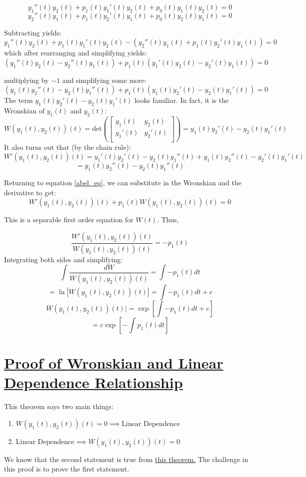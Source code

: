 \documentclass{report}
\begin{document}
{$$y_1''(t)y_2(t) + p_1(t)y_1'(t)y_2(t) + p_0(t)y_1(t)y_2(t) = 0$$
$$y_2''(t)y_1(t) + p_1(t)y_2'(t)y_1(t) + p_0(t)y_2(t)y_1(t) = 0$$

Subtracting yields:
$$y_1''(t)y_2(t) + p_1(t)y_1'(t)y_2(t) - (y_2''(t)y_1(t) + p_1(t)y_2'(t)y_1(t)) = 0$$
which after rearranging and simplifying yields:
\begin{equation}
\label{abel_eq}
(y_1''(t)y_2(t)-y_2''(t)y_1(t))+p_1(t)(y_1'(t)y_2(t)-y_2'(t)y_1(t)) = 0
\end{equation}

multiplying by $-1$ and simplifying some more:
$$(y_1(t)y_2''(t)-y_2(t)y_1''(t))+p_1(t)(y_1(t)y_2'(t)-y_2(t)y_1'(t)) = 0$$
The term $y_1(t)y_2'(t)-y_2(t)y_1'(t)$ looks familiar. In fact, it is the Wronskian of $y_1(t)$ and $y_2(t)$:
$$
    W(y_1(t), y_2(t))(t) =
    \text{det}\left(\begin{bmatrix}
        y_1(t) & y_2(t) \\
        y_1'(t) & y_2'(t) \\
        \end{bmatrix}\right)
    = y_1(t)y_2'(t)-y_2(t)y_1'(t)
$$
It also turns out that (by the chain rule):
$$
W'(y_1(t), y_2(t))(t) = y_1'(t)y_2'(t)-y_2(t)y_1''(t)+y_1(t)y_2''(t)-y_2'(t)y_1'(t)
$$
$$=y_1(t)y_2''(t)-y_2(t)y_1''(t)$$

Returning to equation \ref{abel_eq}, we can substitute in the Wronskian and the derivative to get:
$$W'(y_1(t),y_2(t))(t) + p_1(t)W(y_1(t), y_2(t))(t) = 0$$

This is a separable first order equation for $W(t)$. Thus,

$$\frac{W'(y_1(t),y_2(t))(t)}{W(y_1(t), y_2(t))(t)} = -p_1(t)$$
Integrating both sides and simplifying:
$$\int{\frac{dW}{W(y_1(t), y_2(t))(t)} }= \int{-p_1(t)dt}$$
$$=\ln|W(y_1(t), y_2(t))(t)| = \int{-p_1(t)dt} + c$$
$$W(y_1(t), y_2(t))(t)| = \exp{\left[\int{-p_1(t)dt} + c\right]}$$
$$=c\exp{\left[-\int{p_1(t)dt}\right]}$$


\section{\hyperref[th:WrLinDep]{Proof of Wronskian and Linear Dependence Relationship}}
\label{sec:PrWrLinDep}
This theorem says two main things:
\begin{enumerate}
    
    \item$W(y_1(t), y_2(t))(t) = 0 \implies \text{Linear Dependence}$
    
    \item$ \text{Linear Dependence} \implies W(y_1(t), y_2(t))(t) = 0$
\end{enumerate}
We know that the second statement is true from \hyperref[th:wronLinDep]{this theorem.} The challenge in this proof is to prove the first statement.

}
\end{document}
